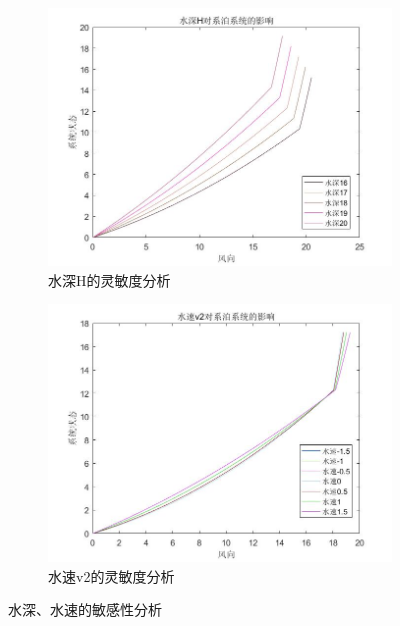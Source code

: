             \begin{figure}[H]
                \centering
                \begin{subfigure}[b]{0.4\textwidth}
                    \includegraphics[width=\textwidth]{images/H_effect_xitong.jpg}
                    \caption{水深H的灵敏度分析}
                    \label{水深H的灵敏度分析}
                \end{subfigure}
                \begin{subfigure}[b]{0.4\textwidth}
                    \includegraphics[width=\textwidth]{images/v2_effect_xitong.jpg}
                    \caption{水速v2的灵敏度分析}
                    \label{水速v2的灵敏度分析}
                \end{subfigure}
                \caption{水深、水速的敏感性分析}
                \label{水深、水速的敏感性分析}
            \end{figure}

